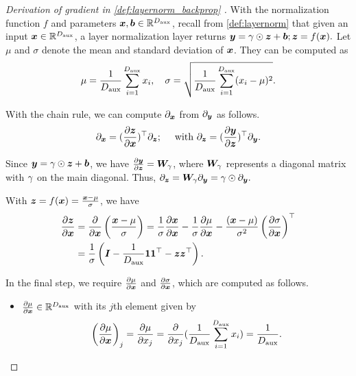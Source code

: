 \layernormbackprop*

\begin{proof}[Derivation of gradient in \cref{def:layernorm_backprop} ]
With the normalization function $f$ and parameters ${\bm{x}}, {\bm{b}} \in \mathbb{R}^{ D_{\text{aux}}}$, recall from \cref{def:layernorm} that given an input ${\bm{x}} \in \mathbb{R}^{ D_{\text{aux}} }$, a layer normalization layer returns ${\bm{y}} = \gamma \odot {\bm{z}} + {\bm{b}}; {\bm{z}} = f({\bm{x}}).$  Let $\mu$ and $\sigma$ denote the mean and standard deviation of ${\bm{x}}$. They can be computed as 
\begin{align*}
    \mu = \frac{1}{ D_{\text{aux}} } \sum_{i=1}^{D_{\text{aux}}} x_i, \quad \sigma = \sqrt{ \frac{ 1 }{ D_{\text{aux}} } \sum_{i=1}^{D_{\text{aux}}} (x_i - \mu)^2  }.
\end{align*}

With the chain rule, we can compute $\partial_{{\bm{x}}}$ from $\partial_{{\bm{y}}}$ as follows.
\begin{align}
    \partial_{{\bm{x}}} = (\frac{\partial {\bm{z}}}{ \partial {\bm{x}}})^{\top} \partial_{ {\bm{z}} }; \quad \text{ with } 
    \partial_{{\bm{z}}} = (\frac{\partial {\bm{y}}}{ \partial {\bm{z}}})^{\top}  \partial_{ {\bm{y}} }. \label{eq:chainrule_ln}
\end{align}

 
Since ${\bm{y}} = \gamma \odot {\bm{z}} + {\bm{b}}$, we have $\frac{\partial {\bm{y}}}{ \partial {\bm{z}}} = {\bm{W}}_{\mathbf{\gamma}}$, where ${\bm{W}}_{\mathbf{\gamma}}$ represents a diagonal matrix with $\mathbf{\gamma}$ on the main diagonal. Thus, $\partial_{{\bm{z}}} = {\bm{W}}_{\mathbf{\gamma}} \partial_{{\bm{y}}} = \mathbf{\gamma} \odot \partial_{{\bm{y}}}.$

With ${\bm{z}} = f({\bm{x}}) = \frac{{\bm{x}} - \mu}{\sigma}$, we have
\begin{align}
    \frac{\partial {\bm{z}}}{ \partial {\bm{x}}} &= \frac{\partial }{ \partial {\bm{x}}} \left( \frac{{\bm{x}} - \mu}{\sigma} \right) = \frac{1}{\sigma} \frac{\partial {\bm{x}}}{ \partial {\bm{x}} } -  \frac{1}{\sigma} \frac{\partial \mu}{ \partial {\bm{x}} } - \frac{({\bm{x}} - \mu)}{\sigma^2} \left(\frac{\partial \sigma}{ \partial {\bm{x}} } \right)^{\top} \nonumber\\&
    = \frac{1}{\sigma} \left( {\bm{I}} - \frac{ 1 }{ D_{\text{aux}} } \mathbf{1} \mathbf{1}^{\top} - {\bm{z}} {\bm{z}}^{\top} \right). \label{eq:dz_dx_ln}
\end{align}

In the final step, we require $\frac{\partial \mu}{ \partial {\bm{x}} }$ and $\frac{\partial \sigma}{ \partial {\bm{x}} }$, which are computed as follows.
\begin{itemize}
    \item $\frac{\partial \mu}{ \partial {\bm{x}} } \in \mathbb{R}^{D_{\text{aux}}}$ with its $j$th element given by 
    \begin{align*}
        \left(\frac{\partial \mu}{ \partial {\bm{x}} }\right)_j = \frac{\partial \mu}{ \partial x_j } = \frac{\partial   }{ \partial x_j } (\frac{1}{ D_{\text{aux}} } \sum_{i=1}^{D_{\text{aux}}} x_i) =  \frac{1}{ D_{\text{aux}} }.
    \end{align*}


\end{itemize}
\end{proof}
